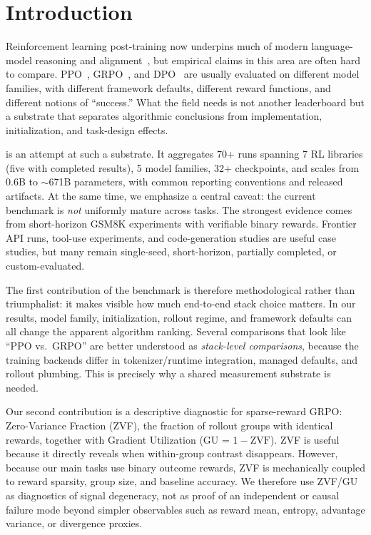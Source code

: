 \section{Introduction}
\label{sec:intro}

Reinforcement learning post-training now underpins much of modern
language-model reasoning and alignment~\citep{ouyang2022training, %
guo2025deepseekr1nature}, but empirical claims in this area are often hard to
compare. PPO~\citep{schulman2017proximal}, GRPO~\citep{shao2024deepseekmath},
and DPO~\citep{rafailov2024direct} are usually evaluated on different model
families, with different framework defaults, different reward functions, and
different notions of ``success.'' What the field needs is not another
leaderboard but a substrate that separates algorithmic conclusions from
implementation, initialization, and task-design effects.

\ours{} is an attempt at such a substrate. It aggregates 70+ runs spanning 7 RL
libraries (five with completed results), 5 model families, 32+ checkpoints, and
scales from 0.6B to $\sim$671B parameters, with common reporting conventions and
released artifacts.
At the same time, we emphasize a central caveat: the current benchmark is
\emph{not} uniformly mature across tasks. The strongest evidence comes from
short-horizon GSM8K experiments with verifiable binary rewards. Frontier API
runs, tool-use experiments, and code-generation studies are useful case
studies, but many remain single-seed, short-horizon, partially completed, or
custom-evaluated.

The first contribution of the benchmark is therefore methodological rather than
triumphalist: it makes visible how much end-to-end stack choice matters. In our
results, model family, initialization, rollout regime, and framework defaults
can all change the apparent algorithm ranking. Several comparisons that look
like ``PPO vs.\ GRPO'' are better understood as \emph{stack-level comparisons},
because the training backends differ in tokenizer/runtime integration, managed
defaults, and rollout plumbing. This is precisely why a shared measurement
substrate is needed.

Our second contribution is a descriptive diagnostic for sparse-reward GRPO:
Zero-Variance Fraction (ZVF), the fraction of rollout groups with identical
rewards, together with Gradient Utilization (GU = $1-\mathrm{ZVF}$). ZVF is
useful because it directly reveals when within-group contrast disappears.
However, because our main tasks use binary outcome rewards, ZVF is mechanically
coupled to reward sparsity, group size, and baseline accuracy. We therefore use
ZVF/GU as diagnostics of signal degeneracy, not as proof of an independent or
causal failure mode beyond simpler observables such as reward mean, entropy,
advantage variance, or divergence proxies.


